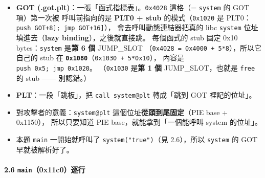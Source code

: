 \documentclass[10pt,a4paper]{article}
\providecommand{\tightlist}{%
  \setlength{\itemsep}{0pt}\setlength{\parskip}{0pt}}
\begin{document}
\begin{itemize}
\tightlist
\item
  \textbf{GOT (.got.plt)}：一張「函式指標表」。\texttt{0x4028} 這格（=
  \texttt{system} 的 GOT 項）第一次被 呼叫前指向的是 \textbf{PLT0 +
  stub} 的模式（\texttt{0x1020} 是
  PLT0：\texttt{push\ \allowbreak{}{[}GOT+8{]};\ \allowbreak{}jmp\ \allowbreak{}{[}GOT+16{]}}），
  會去呼叫動態連結器把真的 libc \texttt{system} 位址填進去（\textbf{lazy
  binding}），之後就直接跳。 每個函式的 stub 固定 0x10
  bytes：\texttt{system} 是\textbf{第 6 個} JUMP\_SLOT
  （\texttt{0x4028\ \allowbreak{}=\ \allowbreak{}0x4000\ \allowbreak{}+\ \allowbreak{}5*8}），所以它自己的 stub 在
  \textbf{\texttt{0x1080}}（\texttt{0x1030\ \allowbreak{}+\ \allowbreak{}5*0x10}）， 內容是
  \texttt{push\ \allowbreak{}0x5;\ \allowbreak{}jmp\ \allowbreak{}0x1020}。 （\texttt{0x1030} 是\textbf{第 1
  個} JUMP\_SLOT，也就是 \texttt{free} 的 stub ------ 別認錯。）
\item
  \textbf{PLT}：一段「跳板」，把 \texttt{call\ \allowbreak{}system@plt} 轉成「跳到
  GOT 裡記的位址」。
\item
  對攻擊者的意義：\texttt{system@plt} 這個位址\textbf{從頭到尾固定}（PIE
  base + 0x1150）， 所以只要知道 PIE base，就能拿到「一個能呼叫 system
  的位址」。
\item
  本題 \texttt{main} 一開始就呼叫了 \texttt{system("true")}（見
  2.6），所以 \texttt{system} 的 GOT 早就被解析好了。
\end{itemize}

\paragraph{\texorpdfstring{2.6
\texttt{main}（0x11c0）逐行}{2.6 main（0x11c0）逐行}}\label{main0x11c0ux9010ux884c}
\end{document}

